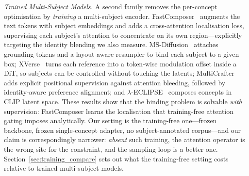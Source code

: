 \documentclass[10pt,twocolumn,letterpaper]{article}
\begin{document}
\noindent\textit{Trained Multi-Subject Models.}
A second family removes the per-concept optimisation by \emph{training} a
multi-subject encoder.  FastComposer~\cite{xiao2024fastcomposer}
augments the text tokens with subject embeddings and adds a
cross-attention localisation loss, supervising each subject's attention
to concentrate on its own region---explicitly targeting the identity
blending we also measure.  MS-Diffusion~\cite{wang2025msdiffusion}
attaches grounding tokens and a layout-aware resampler to bind each
subject to a given box; XVerse~\cite{chen2025xverse} turns each reference
into a token-wise modulation offset inside a DiT, so subjects can be
controlled without touching the latents; MultiCrafter~\cite{wu2026multicrafter}
adds explicit positional supervision against attention bleeding, followed by
identity-aware preference alignment; and
$\lambda$-ECLIPSE~\cite{patel2024lambda} composes concepts in CLIP
latent space.  These results show that the binding problem is solvable
\emph{with} supervision: FastComposer learns the localisation that
training-free attention gating imposes analytically.  Our setting is the
training-free one---frozen backbone, frozen single-concept adapter, no
subject-annotated corpus---and our claim is correspondingly narrower:
\emph{absent} such training, the attention operator is the wrong site for
the constraint, and the sampling loop is a better one.
Section~\ref{sec:training_compare} sets out what the training-free
setting costs relative to trained multi-subject models.
\end{document}
